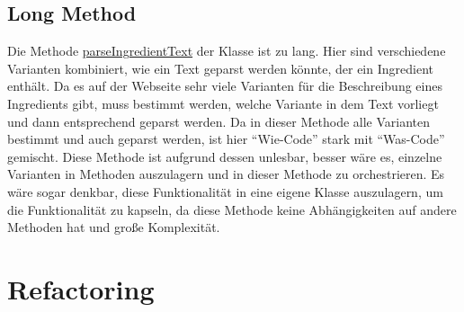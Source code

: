 \subsection{Long Method}
Die Methode \href{https://github.com/anditru/quickie/blob/bb41442c7f1ffbfcd3117cd86a40f7932e543a33/0-quickie-plugin-scraper/src/main/java/org/pinkcrazyunicorn/quickie/plugins/scraper/HensslerScraper.java#L100}{parseIngredientText} der Klasse \href{https://github.com/anditru/quickie/blob/bb41442c7f1ffbfcd3117cd86a40f7932e543a33/0-quickie-plugin-scraper/src/main/java/org/pinkcrazyunicorn/quickie/plugins/scraper/HensslerScraper.java}{} ist zu lang. Hier sind verschiedene Varianten kombiniert, wie ein Text geparst werden könnte, der ein Ingredient enthält. Da es auf der Webseite sehr viele Varianten für die Beschreibung eines Ingredients gibt, muss bestimmt werden, welche Variante in dem Text vorliegt und dann entsprechend geparst werden. Da in dieser Methode alle Varianten bestimmt und auch geparst werden, ist hier \enquote{Wie-Code} stark mit \enquote{Was-Code} gemischt. Diese Methode ist aufgrund dessen unlesbar, besser wäre es, einzelne Varianten in Methoden auszulagern und in dieser Methode zu orchestrieren. Es wäre sogar denkbar, diese Funktionalität in eine eigene Klasse auszulagern, um die Funktionalität zu kapseln, da diese Methode keine Abhängigkeiten auf andere Methoden hat und große Komplexität.

\section{Refactoring}
%


